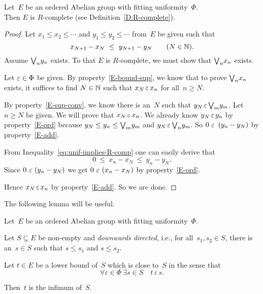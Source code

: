 \documentclass[main.tex]{subfiles}
\begin{document}
%
%
\begin{lem}
Let~$E$ be an ordered Abelian group with fitting uniformity~$\Phi$.\\
Then $E$ is $R$-complete (see Definition~\ref{D:R-complete}).
\end{lem}
\begin{proof}
Let $x_1 \leq x_2 \leq \dotsb$
and $y_1 \leq y_2 \leq \dotsb$ from~$E$ be given such that
\begin{equation}
\label{eq:unif-implies-R-comp}
x_{N+1} - x_N \ \leq\ y_{N+1} - y_N
\qquad(N\in\mathbb{N}).
\end{equation}
Assume $\textstyle{\bigvee}_n y_n$ exists.
To that $E$ is $R$-complete,
we must show that $\textstyle{\bigvee}_n x_n$ exists.

Let $\varepsilon \in \Phi$ be given.
By property~\ref{E-bound-sup},
we know that 
to prove  $\textstyle{\bigvee}_n x_n$ exists,
it suffices to find $N\in \mathbb{N}$ such that $x_N \,\varepsilon\, x_n$
for all~$n\geq N$.

By property~\ref{E-sup-conv},
we know there is an~$N$ such that $y_N \,\varepsilon\, \textstyle{\bigvee}_m y_m$.
Let $n\geq N$ be given.
We will prove that $x_N \,\varepsilon\, x_n$.
We already know  $y_N \,\varepsilon\, y_n$
by property~\ref{E-ord}
because $y_N \leq y_n \leq \textstyle{\bigvee}_m y_m$
and $y_N \,\varepsilon\, \textstyle{\bigvee}_n y_m$.
So 
 $0\,\,\varepsilon\,\  (y_n - y_N)$
by property~\ref{E-add}.

From Inequality~\eqref{eq:unif-implies-R-comp}
one can easily derive that
\begin{equation*}
0 \ \leq\ x_n - x_N \ \leq\ y_n - y_N.
\end{equation*}
Since $0 \,\,\varepsilon\,\,(y_n-y_N)$
we get $0 \,\,\varepsilon\,\, (x_n -x_N)$ by property~\ref{E-ord}.

Hence $x_N \,\varepsilon\, x_n$ by property~\ref{E-add}.
So we are done.
\end{proof}
%
%
The following lemma will be useful.
\begin{lem}
\label{lem:conv-inf}
Let~$E$ be an ordered Abelian group with 
fitting uniformity~$\Phi$.

Let $S\subseteq E$
be non-empty and \emph{downwards directed},
i.e., for all~$s_1,s_2\in S$,
there is an~$s\in S$ such that $s\leq s_1$
and $s\leq s_2$.

Let $t\in E$ be a lower bound of~$S$
which is close to~$S$ in the sense that
\begin{equation}
\label{eq:L:conv-inf}
\forall\varepsilon\in\Phi\ \exists s\in S\quad t\,\varepsilon\, s\text{.}
\end{equation}

Then~$t$ is the infimum of~$S$.
\end{lem}
\end{document}
